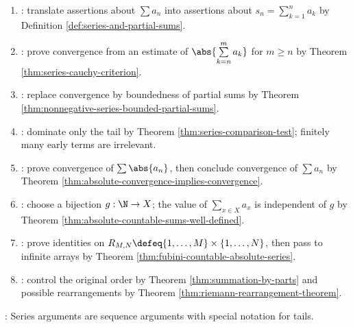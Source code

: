 \begin{proofmethod} \label{meth:series-proof-patterns} 
\begin{enumerate}[label=(\roman*)]
\setlength{\itemsep}{0pt}
\item {}: translate assertions about $\sum a_n$ into assertions about $s_n=\sum\limits_{k=1}^{n}a_k$ by Definition \ref{def:series-and-partial-sums}.
\item {}: prove convergence from an estimate of $\abs{\sum\limits_{k=n}^{m}a_k}$ for $m\geq n$ by Theorem \ref{thm:series-cauchy-criterion}.
\item {}: replace convergence by boundedness of partial sums by Theorem \ref{thm:nonnegative-series-bounded-partial-sums}.
\item {}: dominate only the tail by Theorem \ref{thm:series-comparison-test}; finitely many early terms are irrelevant.
\item {}: prove convergence of $\sum\abs{a_n}$, then conclude convergence of $\sum a_n$ by Theorem \ref{thm:absolute-convergence-implies-convergence}.
\item {}: choose a bijection $g:\N\to X$; the value of $\sum\limits_{x\in X}a_x$ is independent of $g$ by Theorem \ref{thm:absolute-countable-sums-well-defined}.
\item {}: prove identities on $R_{M,N}\defeq\{1,\ldots,M\}\times\{1,\ldots,N\}$, then pass to infinite arrays by Theorem \ref{thm:fubini-countable-absolute-series}.
\item {}: control the original order by Theorem \ref{thm:summation-by-parts} and possible rearrangements by Theorem \ref{thm:riemann-rearrangement-theorem}.
\end{enumerate}
: Series arguments are sequence arguments with special notation for tails.
\end{proofmethod}
